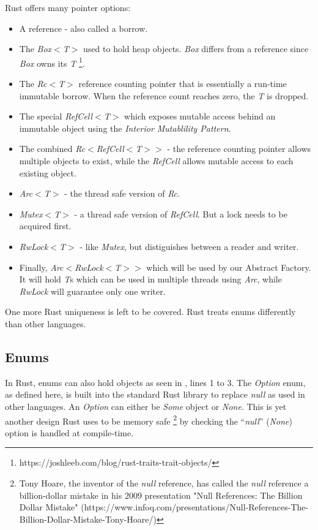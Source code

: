 \documentclass[a4paper,10pt]{article}
\begin{document}
Rust offers many pointer options: \cite{klabnik_2019_01}
\begin{itemize}
  \item A reference - also called a borrow.
  \item The \textit{Box$<$T$>$} used to hold heap objects.
        \textit{Box} differs from a reference since \textit{Box} owns its \textit{T} \footnote{https://joshleeb.com/blog/rust-traits-trait-objects/}.
  \item The \textit{Rc$<$T$>$} reference counting pointer that is essentially a run-time immutable borrow.
        When the reference count reaches zero, the \textit{T} is dropped.
  \item The special \textit{RefCell$<$T$>$} which exposes mutable access behind an immutable object using the \textit{Interior Mutablility Pattern}.
  \item The combined \textit{Rc$<$RefCell$<$T$>$$>$} - the reference counting pointer allows multiple objects to exist, while the \textit{RefCell} allows mutable access to each existing object.
  \item \textit{Arc$<$T$>$} - the thread safe version of \textit{Rc}.
  \item \textit{Mutex$<$T$>$} - a thread safe version of \textit{RefCell}.
        But a lock needs to be acquired first.
  \item \textit{RwLock$<$T$>$} - like \textit{Mutex}, but distiguishes between a reader and writer.
  \item Finally, \textit{Arc$<$RwLock$<$T$>$$>$} which will be used by our Abstract Factory.
        It will hold \textit{T}s which can be used in multiple threads using \textit{Arc}, while \textit{RwLock} will guarantee only one writer.
\end{itemize}

One more Rust uniqueness is left to be covered. Rust treats enums differently than other languages.

\subsection{Enums}
In Rust, enums can also hold objects \cite{klabnik_2019_01} as seen in , lines 1 to 3.
The \textit{Option} enum, as defined here, is built into the standard Rust library \cite{klabnik_2019_01} to replace \textit{null} as used in other languages.
An \textit{Option} can either be \textit{Some} object or \textit{None}.
This is yet another design Rust uses to be memory safe \footnote{Tony Hoare, the inventor of the \textit{null} reference, has called the \textit{null} reference a billion-dollar mistake in his 2009 presentation "Null References: The Billion Dollar Mistake" (https://www.infoq.com/presentations/Null-References-The-Billion-Dollar-Mistake-Tony-Hoare/)} by checking the ``\textit{null}'' (\textit{None}) option is handled at compile-time.
\end{document}
